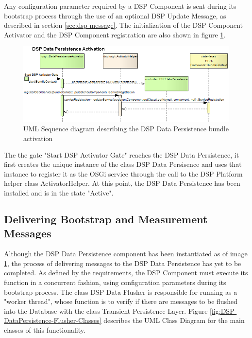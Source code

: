 Any configuration parameter required by a DSP Component is sent
during its bootstrap process through the use of an optional DSP Update Message,
as described in section \ref{sec:dsp-message}. The initialization of the DSP
Component Activator and the DSP Component registration are also shown in figure
\ref{fig:From-OSGi-Framework-to-DSP-Data-PersistenceActivator-Sequence-Diagram}.

\begin{figure}[!b]
  \centering
  \includegraphics[scale=0.5]{../diagrams/From-OSGi-Framework-to-DSP-Data-PersistenceActivator-Sequence-Diagram}
  \caption{UML Sequence diagram describing the DSP Data Persistence bundle activation}
  \label{fig:From-OSGi-Framework-to-DSP-Data-PersistenceActivator-Sequence-Diagram}
\end{figure}

The the gate "Start DSP Activator Gate" reaches the DSP Data Persistence, it
first creates the unique instance of the class DSP Data Persisence and uses
that instance to register it as the OSGi service through the call to the DSP
Platform helper class ActivatorHelper. At this point, the DSP Data Persistence
has been installed and is in the state "Active".

\subsection{Delivering Bootstrap and Measurement Messages}

Although the DSP Data Persistence component has been instantiated as of image
\ref{fig:From-OSGi-Framework-to-DSP-Data-PersistenceActivator-Sequence-Diagram}, 
the process of delivering messages to the DSP Data Persistence has yet to be
completed. As defined by the requirements, the DSP Component must execute its
function in a concurrent fashion, using configuration parameters during its
bootstrap process. The class DSP Data Flusher is responsible for running as a
"worker thread", whose function is to verify if there are messages to be
flushed into the Database with the class Transient Persistence Layer. Figure 
\ref{fig:DSP-DataPersistence-Flusher-Classes} describes the UML Class
Diagram \cite{uml} for the main classes of this functionality.


